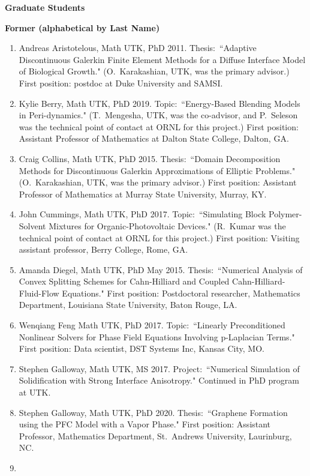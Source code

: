 \documentclass[11pt]{letter}
\begin{document}
{\LARGE\bf  Graduate Students}
	\begin{description}
	\item
{\Large\bf Former (alphabetical by Last Name)}
	\begin{enumerate}
	\item
Andreas Aristotelous, Math UTK, PhD 2011.  Thesis:~``Adaptive Discontinuous Galerkin Finite Element Methods for a Diffuse Interface Model of Biological Growth." (O.~Karakashian, UTK, was the primary advisor.) First position: postdoc at Duke University and SAMSI.
	\item
Kylie Berry, Math UTK, PhD 2019.  Topic:~``Energy-Based Blending Models in Peri-dynamics." (T.~Mengesha, UTK, was the co-advisor, and P.~Seleson was the technical point of contact at ORNL for this project.) First position: Assistant Professor of Mathematics at Dalton State College, Dalton, GA.
	\item
Craig Collins, Math UTK, PhD 2015.  Thesis:~``Domain Decomposition Methods for Discontinuous Galerkin Approximations of Elliptic Problems." (O.~Karakashian, UTK, was the primary advisor.) First position: Assistant Professor of Mathematics at Murray State University, Murray, KY.
	\item
John Cummings, Math UTK, PhD 2017.  Topic:~``Simulating Block Polymer-Solvent Mixtures for Organic-Photovoltaic Devices."  (R.~Kumar was the technical point of contact at ORNL for this project.) First position: Visiting assistant professor, Berry College, Rome, GA.
	\item
Amanda Diegel, Math UTK, PhD May 2015.  Thesis:~``Numerical Analysis of Convex Splitting Schemes for Cahn-Hilliard and Coupled Cahn-Hilliard-Fluid-Flow Equations." First position: Postdoctoral researcher, Mathematics Department, Louisiana State University, Baton Rouge, LA.
	\item
Wenqiang Feng  Math UTK, PhD 2017.  Topic:~``Linearly Preconditioned Nonlinear Solvers for Phase Field Equations Involving p-Laplacian Terms." First position: Data scientist, DST Systems Inc, Kansas City, MO. 
	\item
Stephen Galloway, Math UTK, MS 2017.  Project:~``Numerical Simulation of Solidification with Strong Interface Anisotropy." Continued in PhD program at UTK.
	\item
Stephen Galloway, Math UTK, PhD 2020.  Thesis:~``Graphene Formation using the PFC Model with a Vapor Phase." First position: Assistant Professor, Mathematics Department, St.~Andrews University, Laurinburg, NC.
	\item

\end{enumerate}
\end{description}
\end{document}
